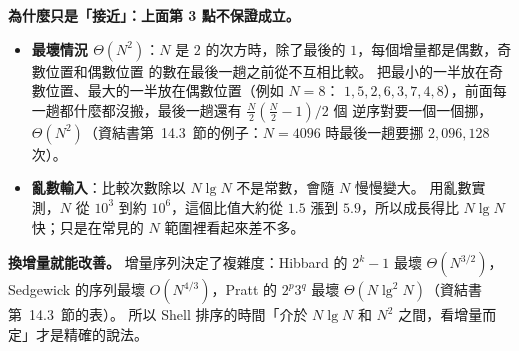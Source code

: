 \begin{pastsoln}
\textbf{為什麼只是「接近」：上面第 3 點不保證成立。}
\begin{itemize}
\item \textbf{最壞情況 $\Theta(N^2)$}：$N$ 是 $2$ 的次方時，除了最後的 $1$，每個增量都是偶數，奇數位置和偶數位置
的數在最後一趟之前從不互相比較。 把最小的一半放在奇數位置、最大的一半放在偶數位置（例如 $N = 8$：
$1, 5, 2, 6, 3, 7, 4, 8$），前面每一趟都什麼都沒搬，最後一趟還有 $\frac{N}{2}\left(\frac{N}{2} - 1\right)/2$ 個
逆序對要一個一個挪，$\Theta(N^2)$（資結書第~14.3~節的例子：$N = 4096$ 時最後一趟要挪 $2{,}096{,}128$ 次）。
\item \textbf{亂數輸入}：比較次數除以 $N \lg N$ 不是常數，會隨 $N$ 慢慢變大。 用亂數實測，$N$ 從 $10^3$ 到約
$10^6$，這個比值大約從 $1.5$ 漲到 $5.9$，所以成長得比 $N \lg N$ 快；只是在常見的 $N$ 範圍裡看起來差不多。
\end{itemize}

\textbf{換增量就能改善。} 增量序列決定了複雜度：Hibbard 的 $2^k - 1$ 最壞 $\Theta(N^{3/2})$，Sedgewick 的序列最壞
$O(N^{4/3})$，Pratt 的 $2^p 3^q$ 最壞 $\Theta(N \lg^2 N)$（資結書第~14.3~節的表）。 所以 Shell 排序的時間「介於
$N \lg N$ 和 $N^2$ 之間，看增量而定」才是精確的說法。
\end{pastsoln}

